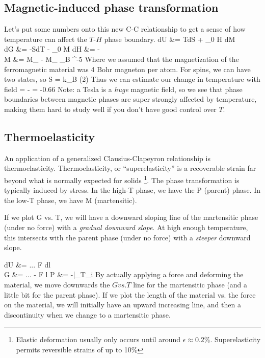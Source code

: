 \documentclass[12pt]{article}
\begin{document}
\subsection{Magnetic-induced phase transformation}
Let's put some numbers onto this new C-C relationship to get a sense of how temperature can affect the $T$-$H$ phase boundary.
\eqs
dU &= TdS + \mu_0 H dM\\
dG &= -SdT - \mu_0 M dH
\eqe
\eqs
{} &= -\\
\eqe
\eqs
\Delta M &= M_ - M_  \mu_B  ^{-5} 
\eqe
Where we assumed that the magnetization of the ferromagnetic material was 4 Bohr magneton per atom.  For spins, we can have two states, so 
\eqs
\Delta S = k_B \ln(2)
\eqe
Thus we can estimate our change in temperature with field
\eqs
{} = - = -0.66 
\eqe
Note: a Tesla is a \emph{huge} magnetic field, so we see that phase boundaries between magnetic phases are super strongly affected by temperature, making them hard to study well if you don't have good control over $T$.

\subsection{Thermoelasticity}
An application of a generalized Clausius-Clapeyron relationship is thermoelasticity. Thermoelasticity, or ``superelasticity'' is a recoverable strain far beyond what is normally expected for solids \footnote{Elastic deformation usually only occurs until around $\epsilon \approx 0.2\%$. Superelasticity permits reversible strains of up to 10\%}.  The phase transformation is typically induced by stress.  In the high-T phase, we have the P (parent) phase.  In the low-T phase, we have M (martensitic).

If we plot G vs. T, we will have a downward sloping line of the martensitic phase (under no force) with a \emph{gradual downward slope}.  At high enough temperature, this intersects with the parent phase (under no force) with a \emph{steeper} downward slope.

\eqs
dU &= ... F dl\\
G &= ... - F \cdot l
P &= -|_{T_i}
\eqe
By actually applying a force and deforming the material, we move downwards the $G vs. T$ line for the martensitic phase (and a little bit for the parent phase).  If we plot the length of the material vs. the force on the material, we will initially have an upward increasing line, and then a discontinuity when we change to a martensitic phase.\\
\end{document}
